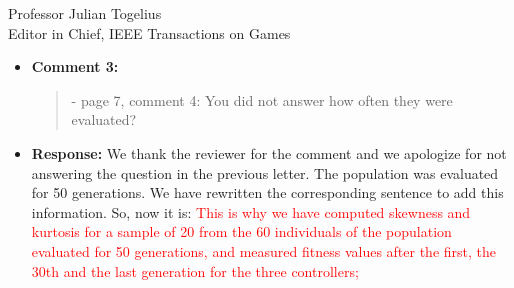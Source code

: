 \documentclass[10pt]{letter} %
\begin{document}
\begin{letter}{Professor Julian Togelius \\ Editor in Chief, IEEE Transactions on Games}
\begin{enumerate}
\begin{itemize}
			\item {\bf Comment 3:}
				\begin{quote}	
					- page 7, comment 4: You did not answer how often they were evaluated?
				\end{quote}	
			\item {\bf Response:} 
			We thank the reviewer for the comment and we apologize for not answering the question in the previous letter. The population was evaluated for 50 generations. We have rewritten the corresponding sentence to add this information. So, now it is:
			\textcolor{red}{This is why we have computed skewness and kurtosis for a sample of 20 from the 60 individuals of the population evaluated for 50 generations, and measured fitness values after the first, the 30th and the last generation for the three controllers;}
			

\end{itemize}
\end{enumerate}
\end{letter}
\end{document}
